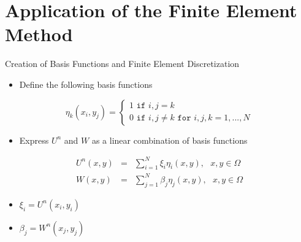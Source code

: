 \documentclass[10pt]{beamer}
\begin{document}
\section{Application of the Finite Element Method}
\begin{frame}{Creation of Basis Functions and Finite Element Discretization} \label{basisfunctionandfinite}
\begin{itemize}
\item Define the following basis functions
\end{itemize}
$$
\eta_{k}\left(x_{i},y_{j}\right)=\begin{cases}
1 \texttt{ if } i,j=k\\
0 \texttt{ if } i,j \neq k \texttt{ for } i,j,k=1,...,N
\end{cases} 
$$

\begin{itemize}
\item Express $U^{n}$ and $W$ as a linear combination of basis functions
\end{itemize}

\begin{eqnarray}\label{UWdiscrete}
U^{n}\left(x,y\right)&=&\sum_{i=1}^{N}\xi_{i}\eta_{i}\left(x,y\right), \texttt{ } x,y \in \Omega \\
\nonumber
W\left(x,y\right)&=&\sum_{j=1}^{N}\beta_{j}\eta_{j}\left(x,y\right), \texttt{ } x,y \in \Omega
\end{eqnarray}

\begin{itemize}
\item $\xi_{i}=U^{n}\left(x_{i},y_{i}\right)$
\item $\beta_{j}=W^{n}\left(x_{j},y_{j}\right)$
\end{itemize}
\hyperlink{Questions}{}
\end{frame}
\end{document}
